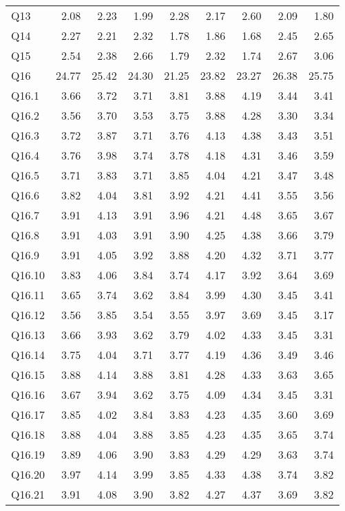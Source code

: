 \documentclass[
]{article}
\begin{document}
\begin{center}
\begin{longtable}{lrrrrrrrr}
Q13 & 2.08 & 2.23 & 1.99 & 2.28 & 2.17 & 2.60 & 2.09 & 1.80\\
Q14 & 2.27 & 2.21 & 2.32 & 1.78 & 1.86 & 1.68 & 2.45 & 2.65\\
\addlinespace
Q15 & 2.54 & 2.38 & 2.66 & 1.79 & 2.32 & 1.74 & 2.67 & 3.06\\
Q16 & 24.77 & 25.42 & 24.30 & 21.25 & 23.82 & 23.27 & 26.38 & 25.75\\
Q16.1 & 3.66 & 3.72 & 3.71 & 3.81 & 3.88 & 4.19 & 3.44 & 3.41\\
Q16.2 & 3.56 & 3.70 & 3.53 & 3.75 & 3.88 & 4.28 & 3.30 & 3.34\\
Q16.3 & 3.72 & 3.87 & 3.71 & 3.76 & 4.13 & 4.38 & 3.43 & 3.51\\
\addlinespace
Q16.4 & 3.76 & 3.98 & 3.74 & 3.78 & 4.18 & 4.31 & 3.46 & 3.59\\
Q16.5 & 3.71 & 3.83 & 3.71 & 3.85 & 4.04 & 4.21 & 3.47 & 3.48\\
Q16.6 & 3.82 & 4.04 & 3.81 & 3.92 & 4.21 & 4.41 & 3.55 & 3.56\\
Q16.7 & 3.91 & 4.13 & 3.91 & 3.96 & 4.21 & 4.48 & 3.65 & 3.67\\
Q16.8 & 3.91 & 4.03 & 3.91 & 3.90 & 4.25 & 4.38 & 3.66 & 3.79\\
\addlinespace
Q16.9 & 3.91 & 4.05 & 3.92 & 3.88 & 4.20 & 4.32 & 3.71 & 3.77\\
Q16.10 & 3.83 & 4.06 & 3.84 & 3.74 & 4.17 & 3.92 & 3.64 & 3.69\\
Q16.11 & 3.65 & 3.74 & 3.62 & 3.84 & 3.99 & 4.30 & 3.45 & 3.41\\
Q16.12 & 3.56 & 3.85 & 3.54 & 3.55 & 3.97 & 3.69 & 3.45 & 3.17\\
Q16.13 & 3.66 & 3.93 & 3.62 & 3.79 & 4.02 & 4.33 & 3.45 & 3.31\\
\addlinespace
Q16.14 & 3.75 & 4.04 & 3.71 & 3.77 & 4.19 & 4.36 & 3.49 & 3.46\\
Q16.15 & 3.88 & 4.14 & 3.88 & 3.81 & 4.28 & 4.33 & 3.63 & 3.65\\
Q16.16 & 3.67 & 3.94 & 3.62 & 3.75 & 4.09 & 4.34 & 3.45 & 3.31\\
Q16.17 & 3.85 & 4.02 & 3.84 & 3.83 & 4.23 & 4.35 & 3.60 & 3.69\\
Q16.18 & 3.88 & 4.04 & 3.88 & 3.85 & 4.23 & 4.35 & 3.65 & 3.74\\
\addlinespace
Q16.19 & 3.89 & 4.06 & 3.90 & 3.83 & 4.29 & 4.29 & 3.63 & 3.74\\
Q16.20 & 3.97 & 4.14 & 3.99 & 3.85 & 4.33 & 4.38 & 3.74 & 3.82\\
Q16.21 & 3.91 & 4.08 & 3.90 & 3.82 & 4.27 & 4.37 & 3.69 & 3.82\\

\end{longtable}
\end{center}
\end{document}
